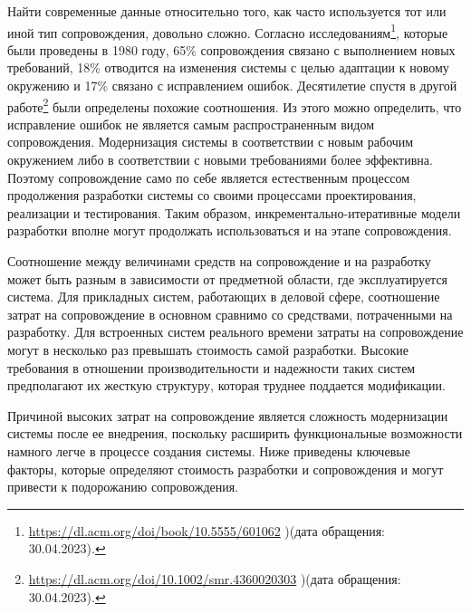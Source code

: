 \documentclass{../../text-style}
\begin{document}
Найти современные данные относительно того, как часто используется тот или иной тип сопровождения, довольно сложно. Согласно исследованиям\footnote{\url{https://dl.acm.org/doi/book/10.5555/601062} )(дата обращения: 30.04.2023).}, которые были проведены в 1980 году, 65\% сопровождения связано с выполнением новых требований, 18\% отводится на изменения системы с целью адаптации к новому окружению и 17\% связано с исправлением ошибок. Десятилетие спустя в другой работе\footnote{\url{https://dl.acm.org/doi/10.1002/smr.4360020303} )(дата обращения: 30.04.2023).} были определены похожие соотношения. Из этого можно определить, что исправление ошибок не является самым распространенным видом сопровождения. Модернизация системы в соответствии с новым рабочим окружением либо в соответствии с новыми требованиями более эффективна. Поэтому сопровождение само по себе является естественным процессом продолжения разработки системы со своими процессами проектирования, реализации и тестирования. Таким образом, инкрементально-итеративные модели разработки вполне могут продолжать использоваться и на этапе сопровождения.

Соотношение между величинами средств на сопровождение и на разработку может быть разным в зависимости от предметной области, где эксплуатируется система. Для прикладных систем, работающих в деловой сфере, соотношение затрат на сопровождение в основном сравнимо со средствами, потраченными на разработку. Для встроенных систем реального времени затраты на сопровождение могут в несколько раз превышать стоимость самой разработки. Высокие требования в отношении производительности и надежности таких систем предполагают их жесткую структуру, которая труднее поддается модификации.

Причиной высоких затрат на сопровождение является сложность модернизации системы после ее внедрения, поскольку расширить функциональные возможности намного легче в процессе создания системы. Ниже приведены ключевые факторы, которые определяют стоимость разработки и сопровождения и могут привести к подорожанию сопровождения.
\end{document}
